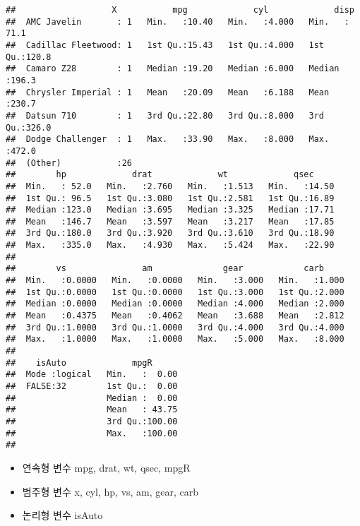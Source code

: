 \documentclass[]{article}
\providecommand{\tightlist}{%
  \setlength{\itemsep}{0pt}\setlength{\parskip}{0pt}}
\begin{document}
\begin{verbatim}
##                   X           mpg             cyl             disp      
##  AMC Javelin       : 1   Min.   :10.40   Min.   :4.000   Min.   : 71.1  
##  Cadillac Fleetwood: 1   1st Qu.:15.43   1st Qu.:4.000   1st Qu.:120.8  
##  Camaro Z28        : 1   Median :19.20   Median :6.000   Median :196.3  
##  Chrysler Imperial : 1   Mean   :20.09   Mean   :6.188   Mean   :230.7  
##  Datsun 710        : 1   3rd Qu.:22.80   3rd Qu.:8.000   3rd Qu.:326.0  
##  Dodge Challenger  : 1   Max.   :33.90   Max.   :8.000   Max.   :472.0  
##  (Other)           :26                                                  
##        hp             drat             wt             qsec      
##  Min.   : 52.0   Min.   :2.760   Min.   :1.513   Min.   :14.50  
##  1st Qu.: 96.5   1st Qu.:3.080   1st Qu.:2.581   1st Qu.:16.89  
##  Median :123.0   Median :3.695   Median :3.325   Median :17.71  
##  Mean   :146.7   Mean   :3.597   Mean   :3.217   Mean   :17.85  
##  3rd Qu.:180.0   3rd Qu.:3.920   3rd Qu.:3.610   3rd Qu.:18.90  
##  Max.   :335.0   Max.   :4.930   Max.   :5.424   Max.   :22.90  
##                                                                 
##        vs               am              gear            carb      
##  Min.   :0.0000   Min.   :0.0000   Min.   :3.000   Min.   :1.000  
##  1st Qu.:0.0000   1st Qu.:0.0000   1st Qu.:3.000   1st Qu.:2.000  
##  Median :0.0000   Median :0.0000   Median :4.000   Median :2.000  
##  Mean   :0.4375   Mean   :0.4062   Mean   :3.688   Mean   :2.812  
##  3rd Qu.:1.0000   3rd Qu.:1.0000   3rd Qu.:4.000   3rd Qu.:4.000  
##  Max.   :1.0000   Max.   :1.0000   Max.   :5.000   Max.   :8.000  
##                                                                   
##    isAuto             mpgR       
##  Mode :logical   Min.   :  0.00  
##  FALSE:32        1st Qu.:  0.00  
##                  Median :  0.00  
##                  Mean   : 43.75  
##                  3rd Qu.:100.00  
##                  Max.   :100.00  
## 
\end{verbatim}

\begin{itemize}
\tightlist
\item
  연속형 변수 mpg, drat, wt, qsec, mpgR
\item
  범주형 변수 x, cyl, hp, vs, am, gear, carb
\item
  논리형 변수 isAuto
\end{itemize}
\end{document}
